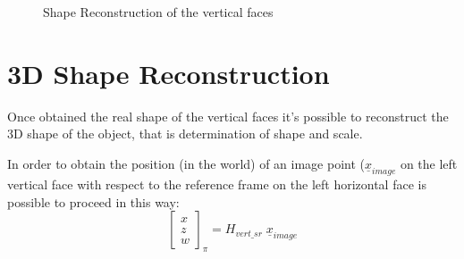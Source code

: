 \documentclass[11pt, oneside]{article}   	%
\begin{document}
\begin{figure}
 \centering
    \qquad
    \caption{Shape Reconstruction of the vertical faces}%
    \label{verticalshaperec}%
\end{figure}

\section{3D Shape Reconstruction}
Once obtained the real shape of the vertical faces it's possible to reconstruct the 3D shape of the object, that is determination of shape and scale.

In order to obtain the position (in the world) of an image point ($\underline{x}_{image}$ on the left vertical face with respect to the reference frame on the left horizontal face is possible to proceed in this way:
$$
\begin{bmatrix}
x \\
z \\
w
\end{bmatrix}_{\pi} = H_{vert\_sr} \; \underline{x}_{image}
$$
\end{document}

